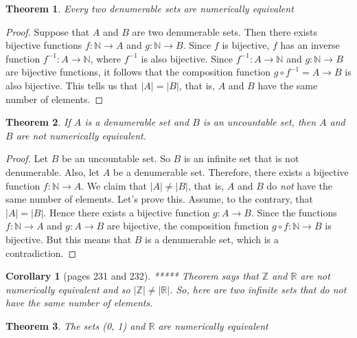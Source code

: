 \documentclass[10pt]{report}
\newtheorem{thm2}{Theorem}[section]
\newtheorem{cor2}{Corollary}[section]
\begin{document}
\begin{thm2}
Every two denumerable sets are numerically equivalent
\end{thm2}
\begin{proof}
Suppose that $A$ and $B$ are two denumerable sets. Then there exists bijective functions $f:\mathbb{N}\to A$ and $g:\mathbb{N}\to B$. Since $f$ is bijective, $f$ has an inverse function $f^{-1}:A\to \mathbb{N}$, where $f^{-1}$ is also bijective. Since $f^{-1}:A\to \mathbb{N}$ and $g:\mathbb{N}\to B$ are bijective functions, it follows that the composition function $g\circ f^{-1}=A\to B$ is also bijective. This tells us that $|A|=|B|$, that is, $A$ and $B$ have the same number of elements.
\end{proof}
\begin{thm2}
If $A$ is a denumerable set and $B$ is an uncountable set, then $A$ and $B$ are not numerically equivalent.
\end{thm2}
\begin{proof}
Let $B$ be an uncountable set. So $B$ is an infinite set that is not denumerable. Also, let $A$ be a denumerable set. Therefore, there exists a bijective function $f:\mathbb{N}\to A$. We claim that $|A|\neq |B|$, that is, $A$ and $B$ do \textit{not} have the same number of elements. Let's prove this. Assume, to the contrary, that $|A|=|B|$. Hence there exists a bijective function $g:A\to B$. Since the functions $f:\mathbb{N}\to A$ and $g:A\to B$ are bijective, the composition function $g\circ f:\mathbb{N}\to B$ is bijective. But this means that $B$ is a denumerable set, which is a contradiction.
\end{proof}
\begin{cor2}[pages 231 and 232] *****
Theorem says that $\mathbb{Z}$ and $\mathbb{R}$ are not numerically equivalent and so $|\mathbb{Z}|\neq |\mathbb{R}|$. So, here are two infinite sets that do \textit{not} have the same number of elements.
\end{cor2}
\begin{thm2}
The sets (0, 1) and $\mathbb{R}$ are numerically equivalent
\end{thm2}
\end{document}
